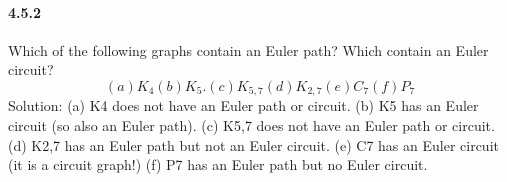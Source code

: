 \documentclass{article}
\begin{document}
\paragraph{4.5.2}
Which of the following graphs contain an Euler path? Which contain an Euler circuit?\newline
$$(a) K_4 (b) K_5. (c) K_{5,7} (d) K_{2,7} (e) C_7 (f) P_7$$
Solution:\newline
(a) K4 does not have an Euler path or circuit.\newline
(b) K5 has an Euler circuit (so also an Euler path).\newline
(c) K5,7 does not have an Euler path or circuit.\newline
(d) K2,7 has an Euler path but not an Euler circuit.\newline
(e) C7 has an Euler circuit (it is a circuit graph!)\newline
(f) P7 has an Euler path but no Euler circuit.
\end{document}
